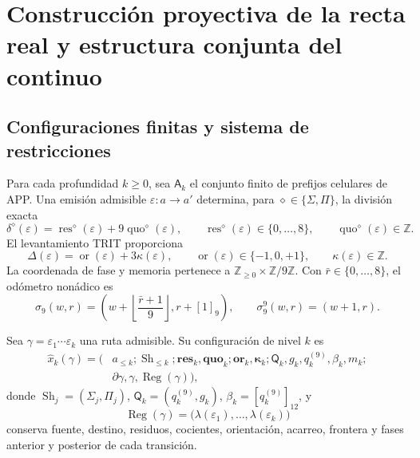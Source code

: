 \section{Construcción proyectiva de la recta real y estructura conjunta del continuo}
\label{sec:construccion-proyectiva-recta}

\subsection{Configuraciones finitas y sistema de restricciones}

Para cada profundidad \(k\geq0\), sea \(\mathsf A_k\) el conjunto finito de
prefijos celulares de APP. Una emisión admisible
\(\varepsilon:a\to a'\) determina, para
\(\diamond\in\{\Sigma,\Pi\}\), la división exacta
\begin{equation}
 \delta^\diamond(\varepsilon)
 =\operatorname{res}^\diamond(\varepsilon)
  +9\operatorname{quo}^\diamond(\varepsilon),
 \qquad
 \operatorname{res}^\diamond(\varepsilon)\in\{0,\ldots,8\},
 \qquad
 \operatorname{quo}^\diamond(\varepsilon)\in\mathbb Z.
 \label{eq:division-app-configuracion-nuclear}
\end{equation}
El levantamiento TRIT proporciona
\begin{equation}
 \Delta(\varepsilon)
 =\operatorname{or}(\varepsilon)+3\kappa(\varepsilon),
 \qquad
 \operatorname{or}(\varepsilon)\in\{-1,0,+1\},
 \qquad
 \kappa(\varepsilon)\in\mathbb Z.
 \label{eq:division-trit-configuracion-nuclear}
\end{equation}
La coordenada de fase y memoria pertenece a
\(\mathbb Z_{\geq0}\times\mathbb Z/9\mathbb Z\). Con
\(\bar r\in\{0,\ldots,8\}\), el odómetro nonádico es
\begin{equation}
 \sigma_9(w,r)
 =\left(
 w+\left\lfloor\frac{\bar r+1}{9}\right\rfloor,
 r+[1]_9\right),
 \qquad
 \sigma_9^9(w,r)=(w+1,r).
 \label{eq:odometro-configuraciones}
\end{equation}

\begin{definition}
Sea \(\gamma=\varepsilon_1\cdots\varepsilon_k\) una ruta admisible. Su
configuración de nivel \(k\) es
\begin{equation}
\begin{aligned}
 \widehat x_k(\gamma)=\bigl(
 &a_{\leq k};\operatorname{Sh}_{\leq k};
 \mathbf{res}_k,\mathbf{quo}_k;
 \mathbf{or}_k,\boldsymbol\kappa_k;
 \mathsf Q_k,g_k,q_k^{(9)},\beta_k,m_k;\\
 &\partial\gamma,\gamma,\operatorname{Reg}(\gamma)
 \bigr),
 \label{eq:configuracion-genealogica-nuclear}
\end{aligned}
\end{equation}
donde \(\operatorname{Sh}_j=(\Sigma_j,\Pi_j)\),
\(\mathsf Q_k=(q_k^{(9)},g_k)\),
\(\beta_k=[q_k^{(9)}]_{12}\), y
\begin{equation}
 \operatorname{Reg}(\gamma)
 =\bigl(\lambda(\varepsilon_1),\ldots,
 \lambda(\varepsilon_k)\bigr)
 \label{eq:registro-ordenado-nuclear}
\end{equation}
conserva fuente, destino, residuos, cocientes, orientación, acarreo,
frontera y fases anterior y posterior de cada transición.
\end{definition}

